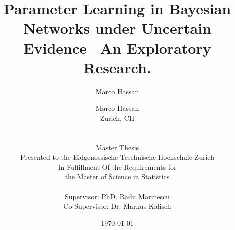 \documentclass[11pt]{article}
\author{Marco Hassan}
\date{\today}
\title{}
\begin{document}
\newtheorem{theorem}{Theorem}

\title{Parameter Learning in Bayesian Networks under Uncertain Evidence  \textendash  \ An Exploratory Research.}
\author{
  Marco Hassan 	           	\\
  Zurich, CH		\\
  \\
  \\
  Master Thesis \\
  Presented to the Eidgenossische Teschnische Hochschule Zurich \\
  In Fulfillment Of the Requirements for \\ 
  the Master of Science in Statistics \\
  \\
  Supervisor: PhD. Radu Marinescu \\
  Co-Supervisor: Dr. Markus Kalisch \\
}
\end{document}
